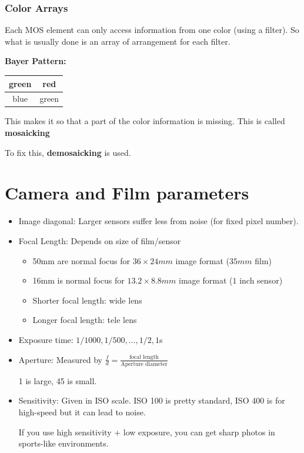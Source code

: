 \documentclass{article}
\begin{document}
\subsubsection{Color Arrays}
Each MOS element can only access information from one color (using a filter). So what is usually done
is an array of arrangement for each filter.

\textbf{Bayer Pattern:}
\begin{center}
  \begin{tabular}{|c|c|}
    \hline
    green & red \\
    \hline
    blue & green \\
    \hline
  \end{tabular}
\end{center}

This makes it so that a part of the color information is missing. This is called \textbf{mosaicking}

To fix this, \textbf{demosaicking} is used.


\section{Camera and Film parameters}

\begin{itemize}
  \item Image diagonal: Larger sensors suffer less from noise (for fixed pixel number). 
  
  \item Focal Length: Depends on size of film/sensor
  \begin{itemize}
    \item 50mm are normal focus for $36\times 24 mm$ image format ($35mm$ film)
    \item 16mm is normal focus for $13.2\times 8.8mm$ image format ($1$ inch sensor)
    \item Shorter focal length: wide lens
    \item Longer focal length: tele lens
  \end{itemize}
  
  \item Exposure time: $1/1000,1/500,\dots,1/2,1$s
  
  \item Aperture: Measured by $\frac{f}{d} = \frac{\text{focal length}}{\text{Aperture diameter}}$
  
  1 is large, 45 is small.

  \item Sensitivity: Given in ISO scale. ISO 100 is pretty standard, ISO 400 is for high-speed but it can lead to noise.
  
  If you use high sensitivity + low exposure, you can get sharp photos in sports-like environments.
\end{itemize}
\end{document}
